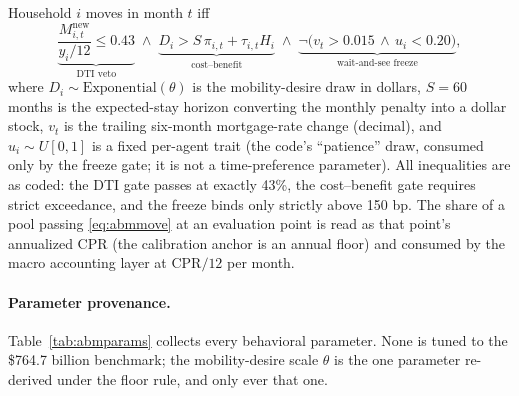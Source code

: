 \documentclass[12pt]{article}
\begin{document}
Household $i$ moves in month $t$ iff
\begin{equation}\label{eq:abmmove}
\underbrace{\frac{M^{\mathrm{new}}_{i,t}}{y_i/12} \le 0.43}_{\text{DTI veto}}
\;\wedge\;
\underbrace{D_i > S\,\pi_{i,t} + \tau_{i,t} H_i}_{\text{cost--benefit}}
\;\wedge\;
\underbrace{\neg\big(v_t > 0.015 \,\wedge\, u_i < 0.20\big)}_{\text{wait-and-see freeze}},
\end{equation}
where $D_i \sim \mathrm{Exponential}(\theta)$ is the mobility-desire draw in dollars, $S = 60$ months is the expected-stay horizon converting the monthly penalty into a dollar stock, $v_t$ is the trailing six-month mortgage-rate change (decimal), and $u_i \sim U[0,1]$ is a fixed per-agent trait (the code's ``patience'' draw, consumed only by the freeze gate; it is not a time-preference parameter). %
All inequalities are as coded: the DTI gate passes at exactly 43\%, the cost--benefit gate requires strict exceedance, and the freeze binds only strictly above 150 bp. The share of a pool passing \eqref{eq:abmmove} at an evaluation point is read as that point's annualized CPR (the calibration anchor is an annual floor) and consumed by the macro accounting layer at $\mathrm{CPR}/12$ per month. %

\paragraph{Parameter provenance.}
Table~\ref{tab:abmparams} collects every behavioral parameter. None is tuned to the \$764.7 billion benchmark; the mobility-desire scale $\theta$ is the one parameter re-derived under the floor rule, and only ever that one.
\end{document}
